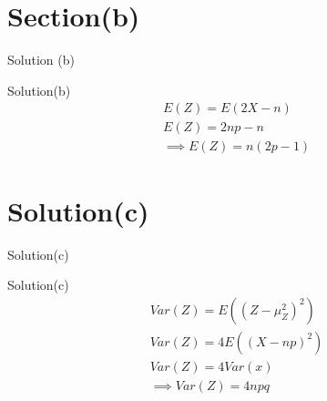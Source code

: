 \documentclass{beamer}
\begin{document}
\section{Section(b)}
\begin{frame}{Solution (b)}
    \begin{block}{Solution(b)}
    \begin{align}
        E(Z)=E(2X-n)\\
        E(Z)=2np-n\\
        \implies\boxed{E(Z)=n(2p-1)}
    \end{align}
    \end{block}
\end{frame}
\section{Solution(c)}
\begin{frame}{Solution(c)}
    \begin{block}{Solution(c)}
    \begin{align}
        Var(Z)=E((Z-\mu_Z^2)^2)\\
        Var(Z)=4E((X-np)^2)\\
        Var(Z)=4Var(x)\\
        \implies\boxed{Var(Z)=4npq}
    \end{align}
    
    \end{block}
\end{frame}
\end{document}
